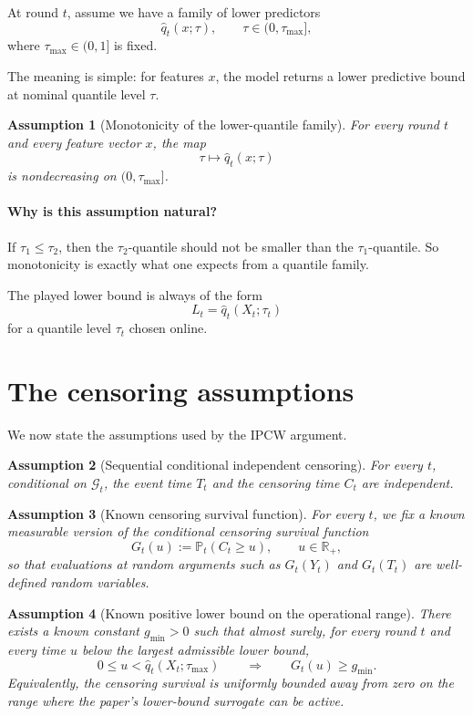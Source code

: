 \documentclass[11pt]{article}
\newtheorem{assumption}{Assumption}
\newcommand{\R}{\mathbb{R}}
\newcommand{\Prob}{\mathbb{P}}
\newcommand{\1}{\mathbf{1}}
\newcommand{\cG}{\mathcal{G}}
\begin{document}
At round $t$, assume we have a family of lower predictors
\[
\hat q_t(x;\tau),\qquad \tau\in(0,\tau_{\max}],
\]
where $\tau_{\max}\in(0,1]$ is fixed.

The meaning is simple: for features $x$, the model returns a lower predictive bound at nominal quantile level $\tau$.

\begin{assumption}[Monotonicity of the lower-quantile family]
\label{ass:monotone}
For every round $t$ and every feature vector $x$, the map
\[
\tau\mapsto \hat q_t(x;\tau)
\]
is nondecreasing on $(0,\tau_{\max}]$.
\end{assumption}

\paragraph{Why is this assumption natural?}
If $\tau_1\le \tau_2$, then the $\tau_2$-quantile should not be smaller than the $\tau_1$-quantile. So monotonicity is exactly what one expects from a quantile family.

The played lower bound is always of the form
\[
L_t=\hat q_t(X_t;\tau_t)
\]
for a quantile level $\tau_t$ chosen online.

\section{The censoring assumptions}
\label{sec:ipcw}

We now state the assumptions used by the IPCW argument.

\begin{assumption}[Sequential conditional independent censoring]
\label{ass:indep}
For every $t$, conditional on $\cG_t$, the event time $T_t$ and the censoring time $C_t$ are independent.
\end{assumption}

\begin{assumption}[Known censoring survival function]
\label{ass:Gknown}
For every $t$, we fix a known measurable version of the conditional censoring survival function
\[
G_t(u):=\Prob_t(C_t\ge u),
\qquad u\in\R_+,
\]
so that evaluations at random arguments such as $G_t(Y_t)$ and $G_t(T_t)$ are well-defined random variables.
\end{assumption}

\begin{assumption}[Known positive lower bound on the operational range]
\label{ass:gmin}
There exists a known constant $g_{\min}>0$ such that almost surely,
for every round $t$ and every time $u$ below the largest admissible lower bound,
\[
0\le u<\hat q_t(X_t;\tau_{\max})
\qquad\Longrightarrow\qquad
G_t(u)\ge g_{\min}.
\]
Equivalently, the censoring survival is uniformly bounded away from zero on the range where the paper's lower-bound surrogate can be active.
\end{assumption}
\end{document}
